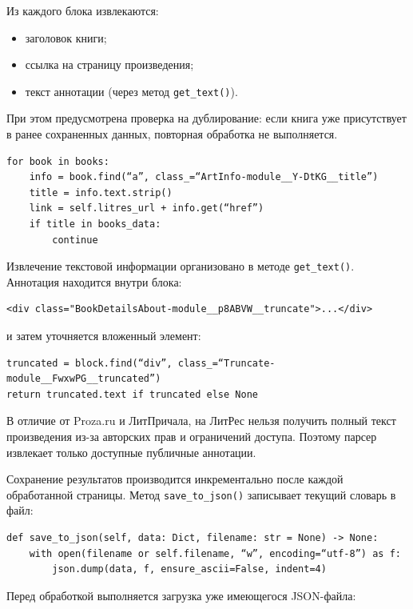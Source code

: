 \documentclass[coursework]{SCWorks}
\begin{document}
    Из каждого блока извлекаются:
    \begin{itemize}
        \item заголовок книги;
        \item ссылка на страницу произведения;
        \item текст аннотации (через метод \texttt{get\_text()}).
    \end{itemize}

    При этом предусмотрена проверка на дублирование: если книга уже присутствует в ранее сохраненных данных, повторная обработка не выполняется.

    \begin{verbatim}
for book in books:
    info = book.find(“a”, class_=“ArtInfo-module__Y-DtKG__title”)
    title = info.text.strip()
    link = self.litres_url + info.get(“href”)
    if title in books_data:
        continue
    \end{verbatim}

    Извлечение текстовой информации организовано в методе \texttt{get\_text()}.
    Аннотация находится внутри блока:

    \begin{verbatim}
<div class="BookDetailsAbout-module__p8ABVW__truncate">...</div>
    \end{verbatim}

    и затем уточняется вложенный элемент:

    \begin{verbatim}
truncated = block.find(“div”, class_=“Truncate-module__FwxwPG__truncated”)
return truncated.text if truncated else None
    \end{verbatim}

    В отличие от Proza.ru и ЛитПричала, на ЛитРес нельзя получить полный текст произведения из-за авторских прав и ограничений доступа.
    Поэтому парсер извлекает только доступные публичные аннотации.

    Сохранение результатов производится инкрементально после каждой обработанной страницы.
    Метод \texttt{save\_to\_json()} записывает текущий словарь в файл:

    \begin{verbatim}
def save_to_json(self, data: Dict, filename: str = None) -> None:
    with open(filename or self.filename, “w”, encoding=“utf-8”) as f:
        json.dump(data, f, ensure_ascii=False, indent=4)
    \end{verbatim}

    Перед обработкой выполняется загрузка уже имеющегося JSON-файла:
\end{document}
